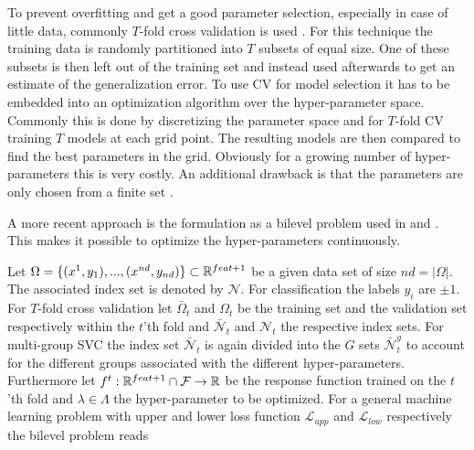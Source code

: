 To prevent overfitting and get a good parameter selection, especially in case of little data, commonly \(T\)-fold cross validation is used \cite[p. 30]{Kunapuli2008}.
For this technique the training data is randomly partitioned into \(T\) subsets of equal size. One of these subsets is then left out of the training set and instead used afterwards to get an estimate of the generalization error. 
To use CV for model selection it has to be embedded into an optimization algorithm over the hyper-parameter space. 
Commonly this is done by discretizing the parameter space and for \(T\)-fold CV training \(T\) models at each grid point. The resulting models are then compared to find the best parameters in the grid.
Obviously for a growing number of hyper-parameters this is very costly. An additional drawback is that the parameters are only chosen from a finite set \cite[p. 30]{Kunapuli2008}.


A more recent approach is the formulation as a bilevel problem used in \cite{Kunapuli2008} and \cite{Moore2011}.
This makes it possible to optimize the hyper-parameters continuously.


Let \(\Omega = \{(x^1,y_1),...,(x^{nd},y_{nd})\} \subset \mathbb{R}^{feat+1}\) be a given data set of size \(nd = |\Omega|\). The associated index set is denoted by \(\mathcal{N}\). For classification the labels \(y_i\) are \(\pm1\).
For \(T\)-fold cross validation let \(\bar{\Omega}_t\) and \(\Omega_t\) be the training set and the validation set respectively within the \(t\)'th fold and \(\bar{\mathcal{N}}_t\) and \(\mathcal{N}_t\) the respective index sets. For multi-group SVC the index set \(\bar{\mathcal{N}}_t\) is again divided into the \(G\) sets \(\bar{\mathcal{N}}_t^g\) to account for the different groups associated with the different hyper-parameters.
Furthermore let \(f^t:\mathbb{R}^{feat+1}\cap\mathcal{F} \to \mathbb{R}\) be the response function trained on the \(t\)'th fold and \(\lambda \in \Lambda\) the hyper-parameter to be optimized.
For a general machine learning problem with upper and lower loss function \(\mathcal{L}_{upp}\) and \(\mathcal{L}_{low}\) respectively the bilevel problem reads
 
